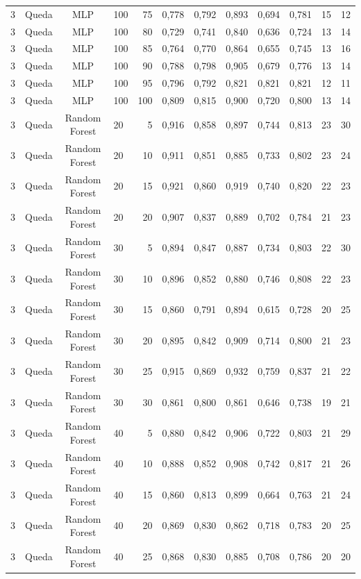 \begin{longtable}{ccclrrrrrrrr}
3 & Queda & MLP & 100 & 75 & 0,778 & 0,792 & 0,893 & 0,694 & 0,781 & 15 & 12 \\
3 & Queda & MLP & 100 & 80 & 0,729 & 0,741 & 0,840 & 0,636 & 0,724 & 13 & 14 \\
3 & Queda & MLP & 100 & 85 & 0,764 & 0,770 & 0,864 & 0,655 & 0,745 & 13 & 16 \\
3 & Queda & MLP & 100 & 90 & 0,788 & 0,798 & 0,905 & 0,679 & 0,776 & 13 & 14 \\
3 & Queda & MLP & 100 & 95 & 0,796 & 0,792 & 0,821 & 0,821 & 0,821 & 12 & 11 \\
3 & Queda & MLP & 100 & 100 & 0,809 & 0,815 & 0,900 & 0,720 & 0,800 & 13 & 14 \\
3 & Queda & Random Forest & 20 & 5 & 0,916 & 0,858 & 0,897 & 0,744 & 0,813 & 23 & 30 \\
3 & Queda & Random Forest & 20 & 10 & 0,911 & 0,851 & 0,885 & 0,733 & 0,802 & 23 & 24 \\
3 & Queda & Random Forest & 20 & 15 & 0,921 & 0,860 & 0,919 & 0,740 & 0,820 & 22 & 23 \\
3 & Queda & Random Forest & 20 & 20 & 0,907 & 0,837 & 0,889 & 0,702 & 0,784 & 21 & 23 \\
3 & Queda & Random Forest & 30 & 5 & 0,894 & 0,847 & 0,887 & 0,734 & 0,803 & 22 & 30 \\
3 & Queda & Random Forest & 30 & 10 & 0,896 & 0,852 & 0,880 & 0,746 & 0,808 & 22 & 23 \\
3 & Queda & Random Forest & 30 & 15 & 0,860 & 0,791 & 0,894 & 0,615 & 0,728 & 20 & 25 \\
3 & Queda & Random Forest & 30 & 20 & 0,895 & 0,842 & 0,909 & 0,714 & 0,800 & 21 & 23 \\
3 & Queda & Random Forest & 30 & 25 & 0,915 & 0,869 & 0,932 & 0,759 & 0,837 & 21 & 22 \\
3 & Queda & Random Forest & 30 & 30 & 0,861 & 0,800 & 0,861 & 0,646 & 0,738 & 19 & 21 \\
3 & Queda & Random Forest & 40 & 5 & 0,880 & 0,842 & 0,906 & 0,722 & 0,803 & 21 & 29 \\
3 & Queda & Random Forest & 40 & 10 & 0,888 & 0,852 & 0,908 & 0,742 & 0,817 & 21 & 26 \\
3 & Queda & Random Forest & 40 & 15 & 0,860 & 0,813 & 0,899 & 0,664 & 0,763 & 21 & 24 \\
3 & Queda & Random Forest & 40 & 20 & 0,869 & 0,830 & 0,862 & 0,718 & 0,783 & 20 & 25 \\
3 & Queda & Random Forest & 40 & 25 & 0,868 & 0,830 & 0,885 & 0,708 & 0,786 & 20 & 20 \\

\end{longtable}
